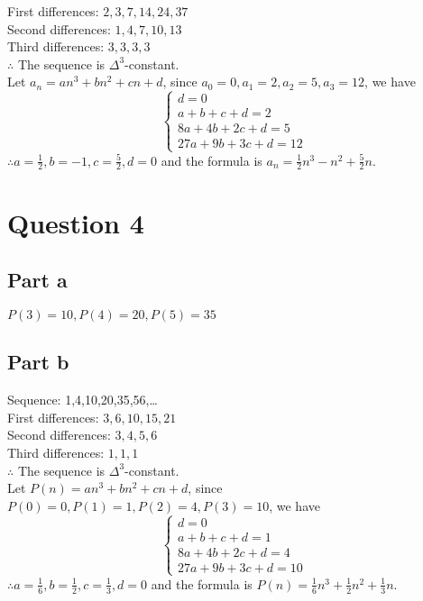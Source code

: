 \documentclass[11pt, oneside]{article}   	%
\begin{document}
	First differences: ${2,3,7,14,24,37}$\\
	Second differences: ${1,4,7,10,13}$\\
	Third differences: ${3,3,3,3}$\\
	$\therefore$ The sequence is $\Delta^{3}$-constant.\\
	Let $a_{n}=an^{3}+bn^{2}+cn+d$, since $a_{0}=0, a_{1}=2, a_{2}=5, a_{3}=12$, we have \\
	\begin{equation}
		\left \{
			\begin{aligned}
			d=0\\
			a+b+c+d=2\\
			8a+4b+2c+d=5\\
			27a+9b+3c+d=12
			\end{aligned}
		\right .
	\end{equation}
	$\therefore a=\frac{1}{2},b=-1,c=\frac{5}{2},d=0$ and the formula is $a_{n}=\frac{1}{2}n^{3}-n^{2}+\frac{5}{2}n$.

\section*{Question 4}

	\subsection*{Part a}
	$P(3)=10, P(4)=20,P(5)=35$
	\subsection*{Part b}
	Sequence: 1,4,10,20,35,56,\ldots \\
	First differences: ${3,6,10,15,21}$\\
	Second differences: ${3,4,5,6}$\\
	Third differences: ${1,1,1}$\\
	$\therefore$ The sequence is $\Delta^{3}$-constant.\\
	Let $P(n)=an^{3}+bn^{2}+cn+d$, since $P(0)=0, P(1)=1, P(2)=4, P(3)=10$, we have \\
	\begin{equation}
		\left \{
			\begin{aligned}
			d=0\\
			a+b+c+d=1\\
			8a+4b+2c+d=4\\
			27a+9b+3c+d=10
			\end{aligned}
		\right .
	\end{equation}
	$\therefore a=\frac{1}{6},b=\frac{1}{2},c=\frac{1}{3},d=0$ and the formula is $P(n)=\frac{1}{6}n^{3}+\frac{1}{2}n^{2}+\frac{1}{3}n$.
\end{document}
